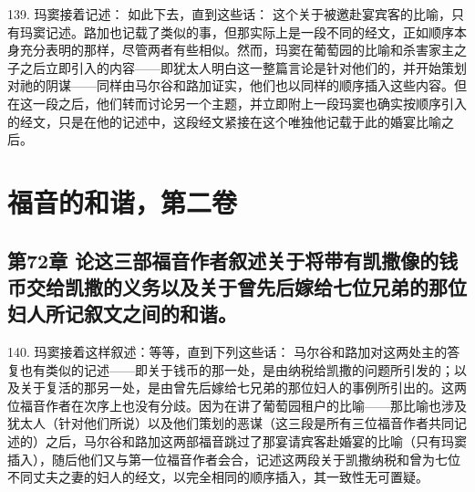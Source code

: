 139. 玛窦接着记述： 如此下去，直到这些话： 这个关于被邀赴宴宾客的比喻，只有玛窦记述。路加也记载了类似的事，但那实际上是一段不同的经文，正如顺序本身充分表明的那样，尽管两者有些相似。然而，玛窦在葡萄园的比喻和杀害家主之子之后立即引入的内容——即犹太人明白这一整篇言论是针对他们的，并开始策划对祂的阴谋——同样由马尔谷和路加证实，他们也以同样的顺序插入这些内容。但在这一段之后，他们转而讨论另一个主题，并立即附上一段玛窦也确实按顺序引入的经文，只是在他的记述中，这段经文紧接在这个唯独他记载于此的婚宴比喻之后。\par



\section{福音的和谐，第二卷}


\subsection{第72章 论这三部福音作者叙述关于将带有凯撒像的钱币交给凯撒的义务以及关于曾先后嫁给七位兄弟的那位妇人所记叙文之间的和谐。}

140. 玛窦接着这样叙述：等等，直到下列这些话： 马尔谷和路加对这两处主的答复也有类似的记述——即关于钱币的那一处，是由纳税给凯撒的问题所引发的；以及关于复活的那另一处，是由曾先后嫁给七兄弟的那位妇人的事例所引出的。这两位福音作者在次序上也没有分歧。因为在讲了葡萄园租户的比喻——那比喻也涉及犹太人（针对他们所说）以及他们策划的恶谋（这三段是所有三位福音作者共同记述的）之后，马尔谷和路加这两部福音跳过了那宴请宾客赴婚宴的比喻（只有玛窦插入），随后他们又与第一位福音作者会合，记述这两段关于凯撒纳税和曾为七位不同丈夫之妻的妇人的经文，以完全相同的顺序插入，其一致性无可置疑。\par

